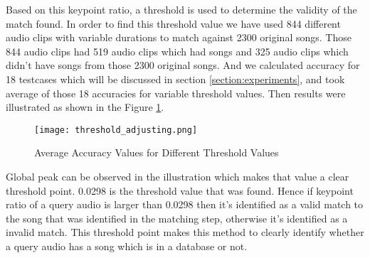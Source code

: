 Based on this keypoint ratio, a threshold is used to determine the validity of the match found. In order to find this
threshold value we have used 844 different audio clips with variable durations to match against 2300 original songs.
Those 844 audio clips had 519 audio clips which had songs and 325 audio clips which didn't have songs from those 
2300 original songs. And we calculated accuracy for 18 testcases which will be discussed in section 
\ref{section:experiments}, and took average of those 18 accuracies for variable threshold values. Then results were
illustrated as shown in the Figure \ref{fig:threshold}. 

\begin{figure}[h]
  \centering
  \texttt{[image: threshold\_adjusting.png]}
  \caption{Average Accuracy Values for Different Threshold Values}
  \label{fig:threshold}
\end{figure}

Global peak can be observed in the illustration which makes that value a clear threshold point. 0.0298 is the threshold
value that was found. Hence if keypoint ratio of a query audio is larger than 0.0298 then it's identified as a valid match
to the song that was identified in the matching step, otherwise it's identified as a invalid match. This threshold point
makes this method to clearly identify whether a query audio has a song which is in a database or not.